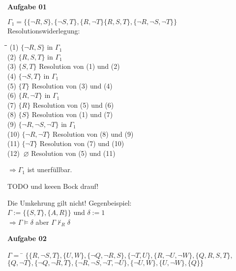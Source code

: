 \documentclass[a4paper,10pt]{article}
\begin{document}
	\parindent0pt
	\textbf{Aufgabe 01}
	\begin{compactenum} [(a)]
		\item $ \Gamma_1 = \{\{\lnot R,S\}, \{\lnot S, T\}, \{R,\lnot T\} \{R,S,T\},\{ \lnot R, \lnot S, \lnot T \} \} $ \\
		
		Resolutionswiderlegung:
		\begin{tabbing}
			\= \qquad \= \qquad\qquad\qquad \= \qquad\qquad \kill
			\>(1) \> $ \{\lnot R, S \} $ \> in $ \Gamma_1 $ \\
			\>(2) \> $ \{R, S, T\} $ \> in $ \Gamma_1 $ \\
			\>(3) \> $ \{S,T \} $ \> Resolution von (1) und (2) \\
			\>(4) \> $ \{\lnot S, T\} $ \> in $ \Gamma_1 $\\
			\>(5) \> $ \{T\} $ \> Resolution von (3) und (4) \\
			\>(6) \> $ \{R, \lnot T\} $ \> in $ \Gamma_1 $\\
			\>(7) \> $ \{R\} $ \> Resolution von (5) und (6) \\
			\>(8) \> $ \{S\} $ \> Resolution von (1) und (7) \\
			\>(9) \> $ \{\lnot R, \lnot S, \lnot T\} $ \> in $ \Gamma_1 $ \\
			\>(10) \> $ \{\lnot R, \lnot T\} $ \> Resolution von (8) und (9) \\
			\>(11) \> $ \{\lnot T\} $ \> Resolution von (7) und (10)\\
			\>(12) \> $ \ \varnothing $ \> Resolution von (5) und (11) 
		\end{tabbing}
		$ \Rightarrow \Gamma_1 $ ist unerfüllbar. \\
		
		\item TODO und keeen Bock drauf! \\
		
		\item Die Umkehrung gilt nicht! Gegenbeispiel: \\
		$ \Gamma := \{\{S,T\}, \{A,R\} \} $ und $ \delta:= 1 $ \\
		$ \Rightarrow \Gamma \models \delta $ aber $ \Gamma \nvdash_R \delta $
	\end{compactenum}
	\newpage
	\textbf{Aufgabe 02}
	\begin{tabbing}
			$ \Gamma = $ \= $ \{\{R,\lnot S,T\},\{U,W\},\{\lnot Q,\lnot R,S\},\{\lnot T,U\},\{R,\lnot U,\lnot W\},\{Q,R,S,T\}, $ \\
			\> $ \{Q,\lnot T\},\{\lnot Q, \lnot R,T\},\{\lnot R,\lnot S,\lnot T,\lnot U\},\{\lnot U,W\},\{U,\lnot W\},\{Q\}\} $
	\end{tabbing}
\end{document}
